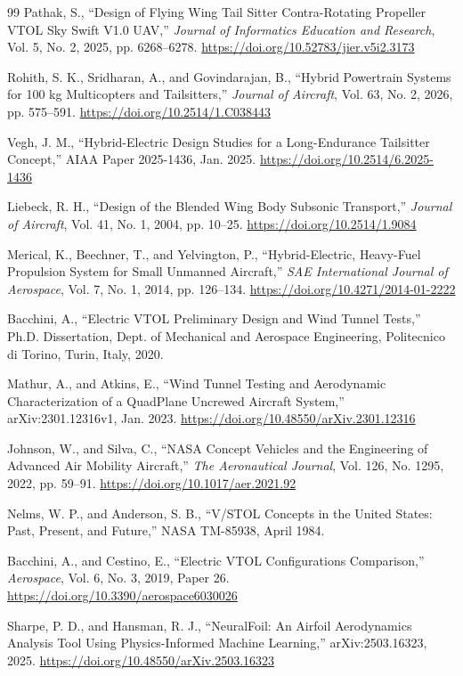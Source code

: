 \documentclass[journal]{new-aiaa}
\begin{document}
\begin{thebibliography}{99}
 Pathak, S., ``Design of Flying Wing Tail Sitter Contra-Rotating Propeller VTOL Sky Swift V1.0 UAV,'' \textit{Journal of Informatics Education and Research}, Vol. 5, No. 2, 2025, pp. 6268--6278. \url{https://doi.org/10.52783/jier.v5i2.3173}

 Rohith, S. K., Sridharan, A., and Govindarajan, B., ``Hybrid Powertrain Systems for 100 kg Multicopters and Tailsitters,'' \textit{Journal of Aircraft}, Vol. 63, No. 2, 2026, pp. 575--591. \url{https://doi.org/10.2514/1.C038443}

 Vegh, J. M., ``Hybrid-Electric Design Studies for a Long-Endurance Tailsitter Concept,'' AIAA Paper 2025-1436, Jan. 2025. \url{https://doi.org/10.2514/6.2025-1436}

 Liebeck, R. H., ``Design of the Blended Wing Body Subsonic Transport,'' \textit{Journal of Aircraft}, Vol. 41, No. 1, 2004, pp. 10--25. \url{https://doi.org/10.2514/1.9084}

 Merical, K., Beechner, T., and Yelvington, P., ``Hybrid-Electric, Heavy-Fuel Propulsion System for Small Unmanned Aircraft,'' \textit{SAE International Journal of Aerospace}, Vol. 7, No. 1, 2014, pp. 126--134. \url{https://doi.org/10.4271/2014-01-2222}

 Bacchini, A., ``Electric VTOL Preliminary Design and Wind Tunnel Tests,'' Ph.D. Dissertation, Dept. of Mechanical and Aerospace Engineering, Politecnico di Torino, Turin, Italy, 2020.

 Mathur, A., and Atkins, E., ``Wind Tunnel Testing and Aerodynamic Characterization of a QuadPlane Uncrewed Aircraft System,'' arXiv:2301.12316v1, Jan. 2023. \url{https://doi.org/10.48550/arXiv.2301.12316}

 Johnson, W., and Silva, C., ``NASA Concept Vehicles and the Engineering of Advanced Air Mobility Aircraft,'' \textit{The Aeronautical Journal}, Vol. 126, No. 1295, 2022, pp. 59--91. \url{https://doi.org/10.1017/aer.2021.92}

 Nelms, W. P., and Anderson, S. B., ``V/STOL Concepts in the United States: Past, Present, and Future,'' NASA TM-85938, April 1984.

 Bacchini, A., and Cestino, E., ``Electric VTOL Configurations Comparison,'' \textit{Aerospace}, Vol. 6, No. 3, 2019, Paper 26. \url{https://doi.org/10.3390/aerospace6030026}

 Sharpe, P. D., and Hansman, R. J., ``NeuralFoil: An Airfoil Aerodynamics Analysis Tool Using Physics-Informed Machine Learning,'' arXiv:2503.16323, 2025. \url{https://doi.org/10.48550/arXiv.2503.16323}


\end{thebibliography}
\end{document}
